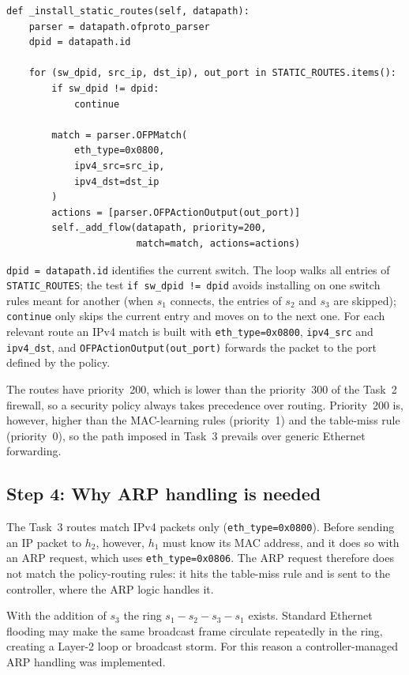 \documentclass[11pt,a4paper]{article}
\newcommand{\code}[1]{\texttt{#1}}
\begin{document}
\begin{lstlisting}[style=py,caption={Proactive installation of the routes}]
def _install_static_routes(self, datapath):
    parser = datapath.ofproto_parser
    dpid = datapath.id

    for (sw_dpid, src_ip, dst_ip), out_port in STATIC_ROUTES.items():
        if sw_dpid != dpid:
            continue

        match = parser.OFPMatch(
            eth_type=0x0800,
            ipv4_src=src_ip,
            ipv4_dst=dst_ip
        )
        actions = [parser.OFPActionOutput(out_port)]
        self._add_flow(datapath, priority=200,
                       match=match, actions=actions)
\end{lstlisting}

\code{dpid = datapath.id} identifies the current switch. The loop walks all
entries of \code{STATIC\_ROUTES}; the test \code{if sw\_dpid != dpid} avoids
installing on one switch rules meant for another (when $s_1$ connects, the
entries of $s_2$ and $s_3$ are skipped); \code{continue} only skips the current
entry and moves on to the next one. For each relevant route an IPv4 match is
built with \code{eth\_type=0x0800}, \code{ipv4\_src} and \code{ipv4\_dst}, and
\code{OFPActionOutput(out\_port)} forwards the packet to the port defined by the
policy.

The routes have priority~200, which is lower than the priority~300 of the
Task~2 firewall, so a security policy always takes precedence over routing.
Priority~200 is, however, higher than the MAC-learning rules (priority~1) and
the table-miss rule (priority~0), so the path imposed in Task~3 prevails over
generic Ethernet forwarding.

\subsection{Step 4: Why ARP handling is needed}
The Task~3 routes match IPv4 packets only (\code{eth\_type=0x0800}). Before
sending an IP packet to $h_2$, however, $h_1$ must know its MAC address, and it
does so with an ARP request, which uses \code{eth\_type=0x0806}. The ARP request
therefore does not match the policy-routing rules: it hits the table-miss rule
and is sent to the controller, where the ARP logic handles it.

With the addition of $s_3$ the ring $s_1 - s_2 - s_3 - s_1$ exists. Standard
Ethernet flooding may make the same broadcast frame circulate repeatedly in the
ring, creating a Layer-2 loop or broadcast storm. For this reason a
controller-managed ARP handling was implemented.
\end{document}
